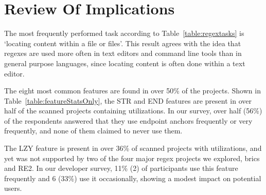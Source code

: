 \section{Review Of Implications}


The most frequently performed task according to Table~\ref{table:regextasks} is `locating content within a file or files'.  This result agrees with the idea that regexes are used more often in text editors and command line tools than in general purpose languages, since locating content is often done within a text editor.



The eight most common features are found in over 50\% of the projects.
Shown in Table~\ref{table:featureStatsOnly}, the STR and END features are present in over half of the scanned projects containing utilizations.  In our survey, over half (56\%) of the respondents answered that they use endpoint anchors frequently or very frequently, and none of them claimed to never use them.

The LZY feature  is present in over 36\% of scanned projects with utilizations, and yet was not supported by two of the four major regex projects we explored, brics and RE2.
In our developer survey, 11\% (2) of participants use this feature frequently and 6 (33\%) use it occasionally, showing a modest impact on potential users.
